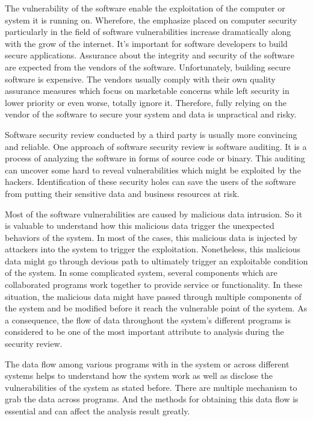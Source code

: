 \label{chapter:introduction}
The vulnerability of the software enable the exploitation of the computer or system it is running on. Wherefore, the emphasize placed on computer security particularly in the field of software vulnerabilities increase dramatically along with the grow of the internet. It's important for software developers to build secure applications. Assurance about the integrity and security of the software are expected from the vendors of the software. Unfortunately, building secure software is expensive. The vendors usually comply with their own quality assurance measures which focus on marketable concerns while left security in lower priority or even worse, totally ignore it. Therefore, fully relying on the vendor of the software to secure your system and data is unpractical and risky.

Software security review conducted by a third party is usually more convincing and reliable. One approach of software security review is software auditing. It is a process of analyzing the software in forms of source code or binary. This auditing can uncover some hard to reveal vulnerabilities which might be exploited by the hackers. Identification of these security holes can save the users of the software from putting their sensitive data and business resources at risk.

Most of the software vulnerabilities are caused by malicious data intrusion. So it is valuable to understand how this malicious data trigger the unexpected behaviors of the system. In most of the cases, this malicious data is injected by attackers into the system to trigger the exploitation. Nonetheless, this malicious data might go through devious path to ultimately trigger an exploitable condition of the system. In some complicated system, several components which are collaborated programs work together to provide service or functionality. In these situation, the malicious data might have passed through multiple components of the system and be modified before it reach the vulnerable point of the system. As a consequence, the flow of data throughout the system's different programs is considered to be one of the most important attribute to analysis during the security review.\cite{dowd_art_2006}

The data flow among various programs with in the system or across different systems helps to understand how the system work as well as disclose the vulnerabilities of the system as stated before. There are multiple mechanism to grab the data across programs. And the methods for obtaining this data flow is essential and can affect the analysis result greatly. 

